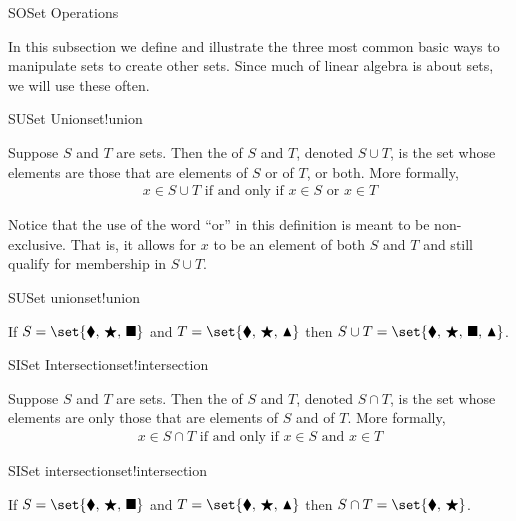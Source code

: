 \begin{subsect}{SO}{Set Operations}
%
\begin{para}In this subsection we define and illustrate the three most common basic ways to manipulate sets to create other sets.  Since much of linear algebra is about sets, we will use these often.\end{para}
%
\begin{definition}{SU}{Set Union}{set!union}
\begin{para}Suppose $S$ and $T$ are sets.  Then the  of $S$ and $T$, denoted $S\cup T$, is the set whose elements are those that are elements of $S$ or of $T$, or both.  More formally,
%
\begin{align*}
x\in S\cup T\text{ if and only if }x\in S\text{ or }x\in T
\end{align*}
\end{para}
%
\end{definition}
%
\begin{para}Notice that the use of the word ``or'' in this definition is meant to be non-exclusive.  That is, it allows for $x$ to be an element of both $S$ and $T$ and still qualify for membership in $S\cup T$.\end{para}
%
\begin{example}{SU}{Set union}{set!union}
\begin{para}If $S=\set{\blacklozenge,\,\bigstar,\,\blacksquare}$ and $T=\set{\blacklozenge,\,\bigstar,\,\blacktriangle}$ then $S\cup T=\set{\blacklozenge,\,\bigstar,\,\blacksquare,\,\blacktriangle}$.\end{para}
\end{example}
%
\begin{definition}{SI}{Set Intersection}{set!intersection}
\begin{para}Suppose $S$ and $T$ are sets.  Then the  of $S$ and $T$, denoted $S\cap T$, is the set whose elements are only those that are elements of $S$ and of $T$.  More formally,
%
\begin{align*}
x\in S\cap T\text{ if and only if }x\in S\text{ and }x\in T
\end{align*}
\end{para}
%
\end{definition}
%
%
\begin{example}{SI}{Set intersection}{set!intersection}
\begin{para}If $S=\set{\blacklozenge,\,\bigstar,\,\blacksquare}$ and $T=\set{\blacklozenge,\,\bigstar,\,\blacktriangle}$ then $S\cap T=\set{\blacklozenge,\,\bigstar}$.\end{para}

\end{example}
\end{subsect}
